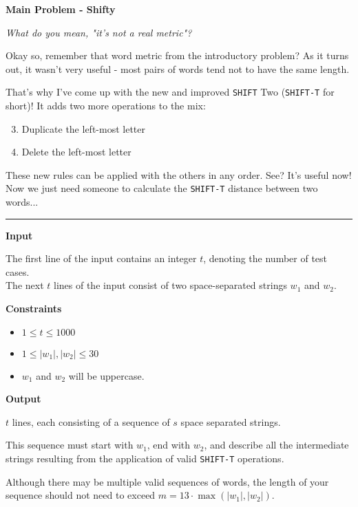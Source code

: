 \LARGE {} \textbf{Main Problem - Shifty} \normalsize

{\itshape What do you mean, "it's not a real metric"?}

Okay so, remember that word metric from the introductory problem? 
As it turns out, it wasn't very useful - most pairs of words tend not to have the same length.

That's why I've come up with the new and improved \texttt{SHIFT} Two (\texttt{SHIFT-T} for short)! 
It adds two more operations to the mix:

\begin{enumerate}
    \setcounter{enumi}{2}
    \item Duplicate the left-most letter
    \item Delete the left-most letter
\end{enumerate}

These new rules can be applied with the others in any order. See? It's useful now!
Now we just need someone to calculate the \texttt{SHIFT-T} distance between two words...

\vspace{8pt}
\hrule

\textbf{Input}

The first line of the input contains an integer $t$, denoting the number of test cases.
\\ The next $t$ lines of the input consist of two space-separated strings $w_1$ and $w_2$.

\textbf{Constraints}

\begin{itemize}
    \item $1 \leq t \leq 1000$
    \item $1 \leq |w_1|, |w_2| \leq 30$
    \item $w_1$ and $w_2$ will be uppercase.
\end{itemize}

\textbf{Output}

$t$ lines, each consisting of a sequence of $s$ space separated strings. 

This sequence must start with $w_1$, end with $w_2$, 
and describe all the intermediate strings resulting from the application of valid \texttt{SHIFT-T} operations. 

Although there may be multiple valid sequences of words,
the length of your sequence should not need to exceed $m = 13 \cdot \max{(|w_1|, |w_2|)}$.

